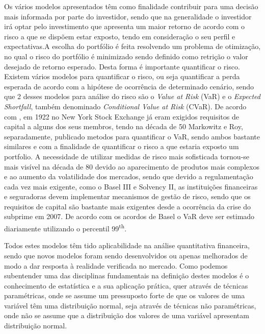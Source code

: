 \documentclass[
  12pt,
  a4paper,
  openany]{book}
\begin{document}
Os vários modelos apresentados têm como finalidade contribuir para uma decisão mais informada por parte do investidor, sendo que na generalidade o investidor irá optar pelo investimento que apresenta um maior retorno de acordo com o risco a que se dispõem estar exposto, tendo em consideração o seu perfil e expectativas.A escolha do portfólio é feita resolvendo um problema de otimização, no qual o risco do portfólio é minimizado sendo definido como retrição o valor desejado de retorno esperado. Desta forma é importante quantificar o risco. Existem vários modelos para quantificar o risco, ou seja quantificar a perda esperada de acordo com a hipótese de ocorrência de determinado cenário, sendo que 2 desses modelos para análise do risco são o \emph{Value at Risk} (VaR) e o \emph{Expected Shortfall}, também denominado \emph{Conditional Value at Risk} (CVaR). De acordo com \citet{HistVaR}, em 1922 no New York Stock Exchange já eram exigidos requisitos de capital a alguns dos seus membros, tendo na década de 50 Markowitz e Roy, separadamente, publicado metodos para quantificar o VaR, sendo ambos bastante similares e com a finalidade de quantificar o risco a que estaria exposto um portfolio. A necessidade de utilizar medidas de risco mais sofisticada tornou-se mais visível na década de 80 devido ao aparecimento de produtos mais complexos e ao aumento da volatilidade dos mercados, sendo que devido a regulamentação cada vez mais exigente, como o Basel III e Solvency II, as instituições financeiras e seguradoras devem implementar mecanismos de gestão de risco, sendo que os requisitos de capital são bastante mais exigentes desde a ocorrência da crise do subprime em 2007. De acordo com os acordos de Basel o VaR deve ser estimado diariamente utilizando o percentil 99\textsuperscript{th}.

Todos estes modelos têm tido aplicabilidade na análise quantitativa financeira, sendo que novos modelos foram sendo desenvolvidos ou apenas melhorados de modo a dar resposta à realidade verificada no mercado. Como podemos subentender uma das disciplinas fundamentais na definição destes modelos é o conhecimento de estatística e a sua aplicação prática, quer através de técnicas paramétricas, onde se assume um pressuposto forte de que os valores de uma variável têm uma distribuição normal, seja através de técnicas não paramétricas, onde não se assume que a distribuição dos valores de uma variável apresentam distribuição normal.
\end{document}
